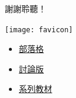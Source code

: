 \documentclass{beamer}
\begin{document}
\begin{CJK}{UTF8}{bsmi}
\begin{frame}{謝謝聆聽！}
  \begin{center}
    \texttt{[image: favicon]}
  \end{center}
  \begin{itemize}
    \item \href{http://jdh8.org/}{部落格}
    \item \href{http://boards.jdh8.org/cal/}{討論版}
    \item \href{https://github.com/jdh8/calculus-2012}{系列教材}
  \end{itemize}
\end{frame}

\end{CJK}
\end{document}

